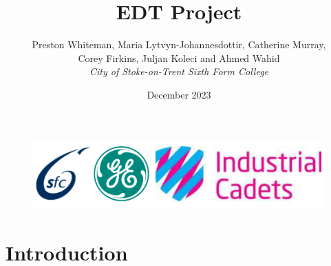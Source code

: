 \documentclass{article}
\title{EDT Project}
\author{
    Preston Whiteman, Maria Lytvyn-Johannesdottir, Catherine Murray, \\
    Corey Firkins, Juljan Koleci and Ahmed Wahid \\
    \textit{City of Stoke-on-Trent Sixth Form College}
}
\date{December 2023}
\begin{document}
\maketitle

\begin{figure}[h]
    \centering
    \includegraphics[width=0.5\linewidth]{logos.png}
    \label{fig:enter-label}
\end{figure}

\section{Introduction}
\end{document}
